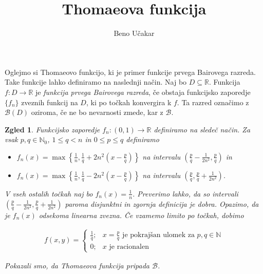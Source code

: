 \documentclass[a4paper,12pt]{article}
\title{Thomaeova funkcija}
\author{Beno Učakar}
\date{}
\newtheorem{zgled}{Zgled}}
\newcommand{\B}{\mathscr{B}}
\begin{document}
\maketitle

Oglejmo si Thomaeovo funkcijo, ki je primer funkcije prvega Bairovega razreda.
Take funkcije lahko definiramo na naslednji način.
Naj bo $D \subseteq \mathbb{R}$. Funkcija $f : D \rightarrow \mathbb{R}$ je \emph{funkcija prvega Bairovega razreda}, 
če obstaja funkcijsko zaporedje $\{f_n\}$ zveznih funkcij na $D$, ki po točkah konvergira k $f$. 
Ta razred označimo z $\B(D)$ oziroma, če ne bo nevarnosti zmede, kar z $\B$.

   
   \begin{zgled}
     Funkcijsko zaporedje $f_n : (0,1)\rightarrow\mathbb{R}$ definiramo na sledeč način.
     Za vsak $p,q \in \mathbb{N}_0$, $1 \le q < n$ in $0 \le p \le q$ definiramo
     \begin{itemize}
         \item \(f_n(x) = \max\left\{\frac{1}{n}, \frac{1}{q} + 2n^2\left(x - \frac{p}{q}\right)\right\}\) na intervalu \(\left(\frac{p}{q} - \frac{1}{2n^2}, \frac{p}{q}\right)\) in
         \item \(f_n(x) = \max\left\{\frac{1}{n}, \frac{1}{q} - 2n^2\left(x - \frac{p}{q}\right)\right\}\) na intervalu \(\left(\frac{p}{q}, \frac{p}{q} + \frac{1}{2n^2}\right)\).
     \end{itemize}
     V vseh ostalih točkah naj bo $f_n(x) = \frac{1}{n}$.
     Preverimo lahko, da so intervali $\left(\frac{p}{q} - \frac{1}{2n^2}, \frac{p}{q} + \frac{1}{2n^2}\right)$ paroma disjunktni in zgornja definicija je dobra.
     Opazimo, da je $f_n(x)$ odsekoma linearna zvezna. Če vzamemo limito po točkah, dobimo
 
     \begin{align*}
        f(x,y) = \begin{cases}
            \frac{1}{q}; & x = \frac{p}{q}   \text{ je pokrajšan ulomek za }   p,q \in \mathbb{N} \\
            0; & x   \text{ je racionalen }
        \end{cases}
     \end{align*}
 
     Pokazali smo, da \emph{Thomaeova funkcija} pripada $\B$. 
   \end{zgled}

\nocite{*}


\end{document}
